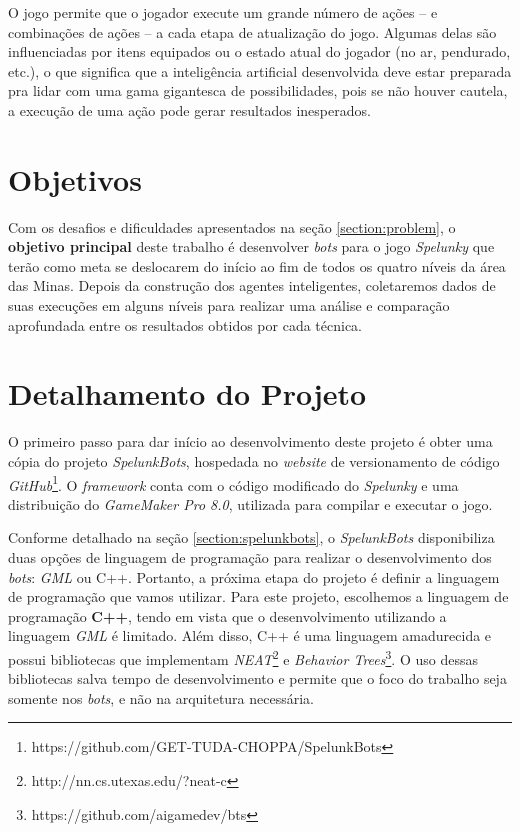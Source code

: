 O jogo permite que o jogador execute um grande número de ações -- e combinações
de ações -- a cada etapa de atualização do jogo. Algumas delas são influenciadas
por itens equipados ou o estado atual do jogador (no ar, pendurado, etc.), o que
significa que a inteligência artificial desenvolvida deve estar preparada pra
lidar com uma gama gigantesca de possibilidades, pois se não houver cautela, a
execução de uma ação pode gerar resultados inesperados.


\section{\label{section:objectives}Objetivos}
Com os desafios e dificuldades apresentados na seção \ref{section:problem}, o
\textbf{objetivo principal} deste trabalho é desenvolver \textit{bots} para o
jogo \textit{Spelunky} que terão como meta se deslocarem do início ao fim de
todos os quatro níveis da área das Minas. Depois da construção dos agentes
inteligentes, coletaremos dados de suas execuções em alguns níveis para realizar
uma análise e comparação aprofundada entre os resultados obtidos por cada
técnica.


\section{\label{section:project-details}Detalhamento do Projeto}
O primeiro passo para dar início ao desenvolvimento deste projeto é obter uma
cópia do projeto \textit{SpelunkBots}, hospedada no \textit{website} de
versionamento de código
\textit{GitHub}\footnote{https://github.com/GET-TUDA-CHOPPA/SpelunkBots}. O
\textit{framework} conta com o código modificado do \textit{Spelunky} e uma
distribuição do \textit{GameMaker Pro 8.0}, utilizada para compilar e executar o
jogo.

Conforme detalhado na seção \ref{section:spelunkbots}, o \textit{SpelunkBots}
disponibiliza duas opções de linguagem de programação para realizar o
desenvolvimento dos \textit{bots}: \textit{GML} ou C++. Portanto, a próxima
etapa do projeto é definir a linguagem de programação que vamos utilizar. Para
este projeto, escolhemos a linguagem de programação \textbf{C++}, tendo em vista
que o desenvolvimento utilizando a linguagem \textit{GML} é limitado. Além
disso, C++ é uma linguagem amadurecida e possui bibliotecas que implementam
\textit{NEAT}\footnote{http://nn.cs.utexas.edu/?neat-c} e \textit{Behavior
Trees}\footnote{https://github.com/aigamedev/bts}. O uso dessas bibliotecas
salva tempo de desenvolvimento e permite que o foco do trabalho seja somente nos
\textit{bots}, e não na arquitetura necessária.

